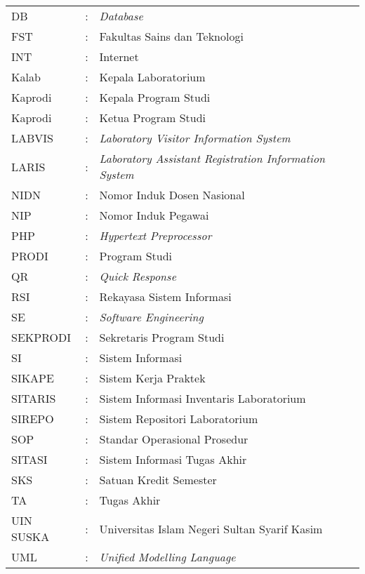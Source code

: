 \begin{tabular}{lll}
	DB        & : & \textit{Database}                                             \\
	FST       & : & Fakultas Sains dan Teknologi                                  \\
	INT       & : & Internet                                                      \\
	Kalab     & : & Kepala Laboratorium                                           \\
	Kaprodi   & : & Kepala Program Studi                                          \\
	Kaprodi   & : & Ketua Program Studi                                           \\
	LABVIS    & : & \textit{Laboratory Visitor Information System}                \\
	LARIS     & : & \textit{Laboratory Assistant Registration Information System} \\
	NIDN      & : & Nomor Induk Dosen Nasional                                    \\
	NIP       & : & Nomor Induk Pegawai                                           \\
	PHP       & : & \textit{Hypertext Preprocessor}                               \\
	PRODI     & : & Program Studi                                                 \\
	QR        & : & \textit{Quick Response}                                       \\
	RSI       & : & Rekayasa Sistem Informasi                                     \\
	SE        & : & \textit{Software Engineering}                                 \\
	SEKPRODI  & : & Sekretaris Program Studi                                      \\
	SI        & : & Sistem Informasi                                              \\
	SIKAPE    & : & Sistem Kerja Praktek                                          \\
	SITARIS   & : & Sistem Informasi Inventaris Laboratorium                      \\
	SIREPO    & : & Sistem Repositori Laboratorium                                \\
	SOP       & : & Standar Operasional Prosedur                                  \\
	SITASI    & : & Sistem Informasi Tugas Akhir                                  \\
	SKS       & : & Satuan Kredit Semester                                        \\
	TA        & : & Tugas Akhir                                                   \\
	UIN SUSKA & : & Universitas Islam Negeri Sultan Syarif Kasim                  \\
	UML       & : & \textit{Unified Modelling Language}                           \\
\end{tabular}